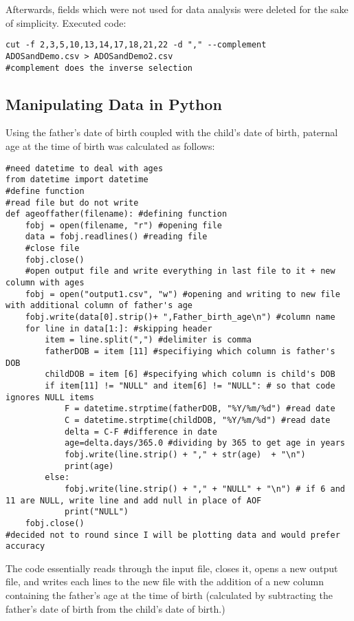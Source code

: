 \documentclass{article}
\begin{document}
Afterwards, fields which were not used for data analysis were deleted for the sake of simplicity. Executed code:
\begin{verbatim}
cut -f 2,3,5,10,13,14,17,18,21,22 -d "," --complement 
ADOSandDemo.csv > ADOSandDemo2.csv 
#complement does the inverse selection
\end{verbatim}

\subsection{Manipulating Data in Python}

Using the father's date of birth coupled with the child's date of birth, paternal age at the time of birth was calculated as follows: 
\begin{verbatim}
#need datetime to deal with ages
from datetime import datetime
#define function
#read file but do not write
def ageoffather(filename): #defining function
    fobj = open(filename, "r") #opening file
    data = fobj.readlines() #reading file
    #close file
    fobj.close()
    #open output file and write everything in last file to it + new column with ages
    fobj = open("output1.csv", "w") #opening and writing to new file with additional column of father's age
    fobj.write(data[0].strip()+ ",Father_birth_age\n") #column name
    for line in data[1:]: #skipping header
        item = line.split(",") #delimiter is comma
        fatherDOB = item [11] #specifiying which column is father's DOB
        childDOB = item [6] #specifying which column is child's DOB
        if item[11] != "NULL" and item[6] != "NULL": # so that code ignores NULL items
            F = datetime.strptime(fatherDOB, "%Y/%m/%d") #read date
            C = datetime.strptime(childDOB, "%Y/%m/%d") #read date
            delta = C-F #difference in date
            age=delta.days/365.0 #dividing by 365 to get age in years
            fobj.write(line.strip() + "," + str(age)  + "\n")
            print(age)
        else:
            fobj.write(line.strip() + "," + "NULL" + "\n") # if 6 and 11 are NULL, write line and add null in place of AOF
            print("NULL")
    fobj.close()
#decided not to round since I will be plotting data and would prefer accuracy
\end{verbatim} 

The code essentially reads through the input file, closes it, opens a new output file, and writes each lines to the new file with the addition of a new column containing the father's age at the time of birth (calculated by subtracting the father's date of birth from the child's date of birth.)
\end{document}
